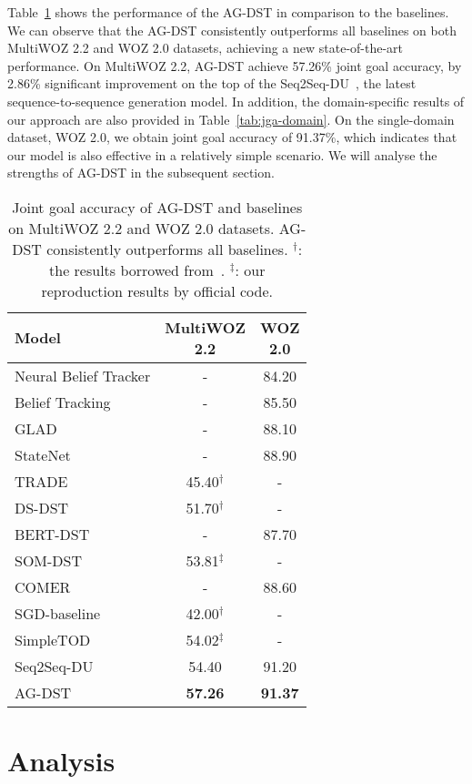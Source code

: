\documentclass[11pt]{article}
\begin{document}
Table~\ref{tab:jga-baselines} shows the performance of the AG-DST in comparison to the baselines. We can observe that the AG-DST consistently outperforms all baselines on both MultiWOZ 2.2 and WOZ 2.0 datasets, achieving a new state-of-the-art performance. On MultiWOZ 2.2, AG-DST achieve 57.26\% joint goal accuracy, by 2.86\% significant improvement on the top of the Seq2Seq-DU~\citep{feng-etal-2021-sequence}, the latest sequence-to-sequence generation model. In addition, the domain-specific results of our approach are also provided in Table~\ref{tab:jga-domain}. 
On the single-domain dataset, WOZ 2.0, we obtain joint goal accuracy of 91.37\%, which indicates that our model is also effective in a relatively simple scenario. We will analyse the strengths of AG-DST in the subsequent section.

\begin{table}
\centering
\begin{tabular}{lcc}
\hline
\textbf{Model} & \makecell[c]{\textbf{MultiWOZ} \\ \textbf{2.2}} & \makecell[c]{\textbf{WOZ} \\ \textbf{2.0}} \\
\hline
\hline
Neural Belief Tracker & - & 84.20 \\
Belief Tracking & - & 85.50 \\
GLAD & - & 88.10 \\
StateNet & - & 88.90 \\
TRADE & 45.40$^\dagger$ & - \\
DS-DST & 51.70$^\dagger$ & - \\
BERT-DST & - & 87.70 \\
SOM-DST & 53.81$^\ddagger$ & - \\
COMER & - & 88.60 \\
SGD-baseline & 42.00$^\dagger$ & - \\
SimpleTOD & 54.02$^\ddagger$ & - \\
Seq2Seq-DU & 54.40 & 91.20 \\
\hline
AG-DST & \textbf{57.26} & \textbf{91.37} \\
\hline
\end{tabular}
\caption{Joint goal accuracy of AG-DST and baselines on MultiWOZ 2.2 and WOZ 2.0 datasets. AG-DST consistently outperforms all baselines. $^\dagger$: the results borrowed from~\citet{zang-etal-2020-multiwoz}. $^\ddagger$: our reproduction results by official code.}\label{tab:jga-baselines}
\end{table}

\section{Analysis}
\end{document}
